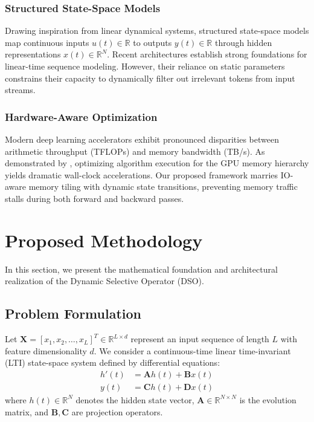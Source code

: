 \documentclass{article}
\begin{document}
\subsubsection{Structured State-Space Models}
Drawing inspiration from linear dynamical systems, structured state-space models map continuous inputs $u(t) \in \mathbb{R}$ to outputs $y(t) \in \mathbb{R}$ through hidden representations $x(t) \in \mathbb{R}^N$. Recent architectures establish strong foundations for linear-time sequence modeling. However, their reliance on static parameters constrains their capacity to dynamically filter out irrelevant tokens from input streams.

\subsubsection{Hardware-Aware Optimization}
Modern deep learning accelerators exhibit pronounced disparities between arithmetic throughput (TFLOPs) and memory bandwidth (TB/s). As demonstrated by \cite{dao2022flashattention}, optimizing algorithm execution for the GPU memory hierarchy yields dramatic wall-clock accelerations. Our proposed framework marries IO-aware memory tiling with dynamic state transitions, preventing memory traffic stalls during both forward and backward passes.


\section{Proposed Methodology}
In this section, we present the mathematical foundation and architectural realization of the Dynamic Selective Operator (DSO).

\subsection{Problem Formulation}
Let $\mathbf{X} = [x_1, x_2, \dots, x_L]^T \in \mathbb{R}^{L \times d}$ represent an input sequence of length $L$ with feature dimensionality $d$. We consider a continuous-time linear time-invariant (LTI) state-space system defined by differential equations:
\begin{align}
h'(t) &= \mathbf{A} h(t) + \mathbf{B} x(t) \\
y(t) &= \mathbf{C} h(t) + \mathbf{D} x(t)
\end{align}
where $h(t) \in \mathbb{R}^N$ denotes the hidden state vector, $\mathbf{A} \in \mathbb{R}^{N \times N}$ is the evolution matrix, and $\mathbf{B}, \mathbf{C}$ are projection operators.
\end{document}
